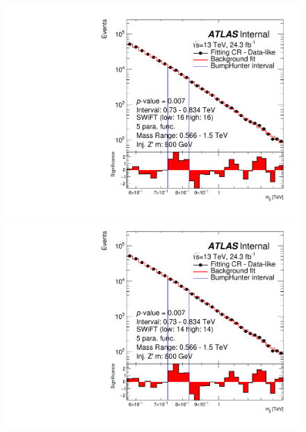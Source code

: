 \begin{figure}[!htb]
\captionsetup[subfigure]{aboveskip=0pt,justification=centering}
\centering
 {
  \includegraphics[width=0.45\linewidth, angle=0]{figs/Dibjet/LowMass/FitStudy_min566/bhFit_corrFitCR_dataLike_5para_low16_high16_inj_Zprimebb800_xsFactor1.pdf}
}
 {
  \includegraphics[width=0.45\linewidth, angle=0]{figs/Dibjet/LowMass/FitStudy_min566/bhFit_corrFitCR_dataLike_5para_low14_high14_inj_Zprimebb800_xsFactor1.pdf}
}\\
 {
}
\end{figure}
